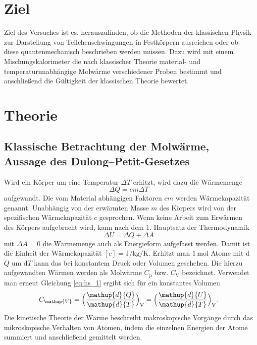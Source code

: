 \section{Ziel}

Ziel des Versuches ist es, herauszufinden, ob die Methoden der klassischen Physik zur Darstellung von Teilchenschwingungen in Festkörpern ausreichen oder ob diese quantenmechanisch beschrieben werden müssen. Dazu wird mit einem Mischungskalorimeter die nach klassischer Theorie material- und temperaturunabhängige Molwärme verschiedener Proben bestimmt und anschließend die Gültigkeit der klassischen Theorie bewertet.
\section{Theorie}
\label{sec:Theorie}
\subsection{Klassische Betrachtung der Molwärme, Aussage des Dulong--Petit-Gesetzes}
Wird ein Körper  um eine Temperatur $\Delta{T}$ erhitzt, wird dazu die Wärmemenge 
\begin{equation}
\Delta{Q}=c m \Delta{T}
\label{eq:waermekapazitaet}
\end{equation}
aufgewandt. Die vom Material abhängigen Faktoren $c m$ werden Wärmekapazität genannt. 
Unabhängig von der erwärmten Masse $m$ des Körpers wird von der spezifischen Wärmekapazität $c$ gesprochen.
Wenn keine Arbeit zum Erwärmen des Körpers aufgebracht wird, kann nach dem 1. Hauptsatz der Thermodynamik
\begin{equation}
	\Delta{U}=\Delta{Q}+\Delta{A}
	\label{eq:hs_1}
\end{equation}
mit $\Delta{A}=0$ die Wärmemenge auch als Energieform aufgefasst werden. 
Damit ist die Einheit der Wärmekapazität $[c]=\si{\joule\per\kilo\gram\per\kelvin}$.
Erhitzt man $\SI{1}{\mol}$ Atome mit d$Q$ um d$T$ kann das bei konstantem Druck oder Volumen geschehen.
Die hierzu aufgewandten Wärmen werden als Molwärme $C_\mathup{p}$ bzw. $C_\mathup{V}$ bezeichnet. 
Verwendet man erneut Gleichung \eqref{eq:hs_1} 
ergibt sich für ein konstantes Volumen 
\begin{equation}
	C_\mathup{V}=\Bigl(\frac{\mathup{d}{Q}}{\mathup{d}{T}}\Bigr)_\text{V}=\Bigl(\frac{\mathup{d}{U}}{\mathup{d}{T}}\Bigr)_\text{V}.
	\label{eq:molwaerme}
\end{equation}
Die kinetische Theorie der Wärme beschreibt makroskopische Vorgänge durch das mikroskopische Verhalten von Atomen, indem die einzelnen Energien der Atome summiert und anschließend gemittelt werden. 
